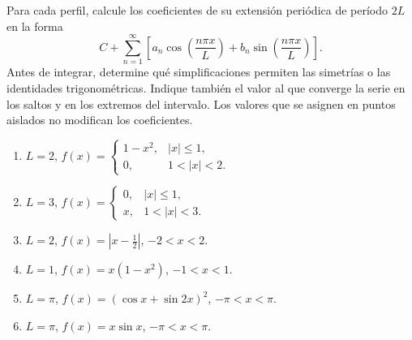 Para cada perfil, calcule los coeficientes de su extensión periódica de período $2L$ en la forma
\[
C+\sum_{n=1}^{\infty}\left[a_n\cos\left(\frac{n\pi x}{L}\right)+b_n\sin\left(\frac{n\pi x}{L}\right)\right].
\]
Antes de integrar, determine qué simplificaciones permiten las simetrías o las identidades trigonométricas. Indique también el valor al que converge la serie en los saltos y en los extremos del intervalo. Los valores que se asignen en puntos aislados no modifican los coeficientes.

\begin{enumerate}[label=(\alph*),ref=\alph*,leftmargin=*]
\item $L=2$, \quad $f(x)=\begin{cases}1-x^2,&|x|\leq1,\\0,&1<|x|<2.\end{cases}$
\item $L=3$, \quad $f(x)=\begin{cases}0,&|x|\leq1,\\x,&1<|x|<3.\end{cases}$
\item $L=2$, \quad $f(x)=|x-\tfrac12|$, \quad $-2<x<2$.
\item $L=1$, \quad $f(x)=x(1-x^2)$, \quad $-1<x<1$.
\item $L=\pi$, \quad $f(x)=(\cos x+\sin2x)^2$, \quad $-\pi<x<\pi$.
\item $L=\pi$, \quad $f(x)=x\sin x$, \quad $-\pi<x<\pi$.
\end{enumerate}
